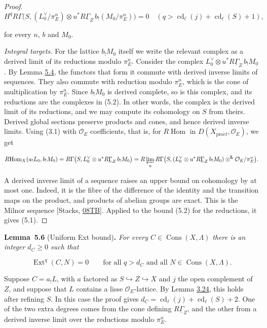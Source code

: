 \documentclass[11pt]{article}
\newenvironment{bpstatement}[2]{\par\addvspace{0.6\baselineskip}\noindent\textbf{#1}#2\textbf{.}\enspace\ignorespaces}
  {\par\addvspace{0.4\baselineskip}}
\newenvironment{bpstatementit}[2]{\begin{bpstatement}{#1}{#2}\itshape\ignorespaces}{\end{bpstatement}}
\providecommand{\Cons}{}\renewcommand{\Cons}{\operatorname{Cons}}
\providecommand{\Ext}{}\renewcommand{\Ext}{\operatorname{Ext}}
\begin{document}
\begin{proof}[{Proof}]
\[
H^q R\Gamma\bigl(S,(L_0^\vee/\pi_E^n)\otimes u^*R\underline\Gamma_Z\,b_!(M_0/\pi_E^n)\bigr)=0
\quad(q>\operatorname{cd}_\ell(j)+\operatorname{cd}_\ell(S)+1),
\tag{5.2}
\]

for every \(n\), \(b\) and \(M_0\).

\emph{Integral targets.} For the lattice \(b_!M_0\) itself we write the relevant complex as a derived limit of its reductions modulo \(\pi_E^n\). Consider the complex \(L_0^\vee\otimes u^*R\underline\Gamma_Z\,b_!M_0\). By Lemma \hyperref[bp421]{5.4}, the functors that form it commute with derived inverse limits of sequences. They also commute with reduction modulo \(\pi_E^n\), which is the cone of multiplication by \(\pi_E^n\). Since \(b_!M_0\) is derived complete, so is this complex, and its reductions are the complexes in (5.2). In other words, the complex is the derived limit of its reductions, and we may compute its cohomology on \(S\) from theirs. Derived global sections preserve products and cones, and hence derived inverse limits. Using (3.1) with \(\mathcal O_E\) coefficients, that is, for \(R\!\operatorname{Hom}\) in \(D(X_{\mathrm{pro}\acute{e}t},\mathcal O_E)\), we get

\[
R\!\operatorname{Hom}_X(a_!L_0,b_!M_0)
=R\Gamma\bigl(S,L_0^\vee\otimes u^*R\underline\Gamma_Z\,b_!M_0\bigr)
=R\varprojlim_n R\Gamma\bigl(S,(L_0^\vee\otimes u^*R\underline\Gamma_Z\,b_!M_0)\otimes^{\mathbf L}\mathcal O_E/\pi_E^n\bigr).
\]

A derived inverse limit of a sequence raises an upper bound on cohomology by at most one. Indeed, it is the fibre of the difference of the identity and the transition maps on the product, and products of abelian groups are exact. This is the Milnor sequence [Stacks, \href{https://stacks.math.columbia.edu/tag/08TB}{08TB}]. Applied to the bound (5.2) for the reductions, it gives (5.1).
\end{proof}

\label{bp426}%
\begin{bpstatementit}{Lemma~5.6}{ (Uniform Ext bound)}
For every \(C\in\Cons(X,\Lambda)\) there is an integer \(d_C\geq0\) such that

\[
\Ext^q(C,N)=0
\qquad\text{for all }q>d_C\text{ and all }N\in\Cons(X,\Lambda).
\]
\end{bpstatementit}

\label{bp427}%
Suppose \(C=a_!L\), with \(a\) factored as \(S\hookrightarrow Z\hookrightarrow X\) and \(j\) the open complement of \(Z\), and suppose that \(L\) contains a lisse \(\mathcal O_E\)-lattice. By Lemma \hyperref[bp269]{3.24}, this holds after refining \(S\). In this case the proof gives \(d_C=\operatorname{cd}_\ell(j)+\operatorname{cd}_\ell(S)+2\). One of the two extra degrees comes from the cone defining \(R\underline\Gamma_Z\), and the other from a derived inverse limit over the reductions modulo \(\pi_E^n\).
\end{document}
